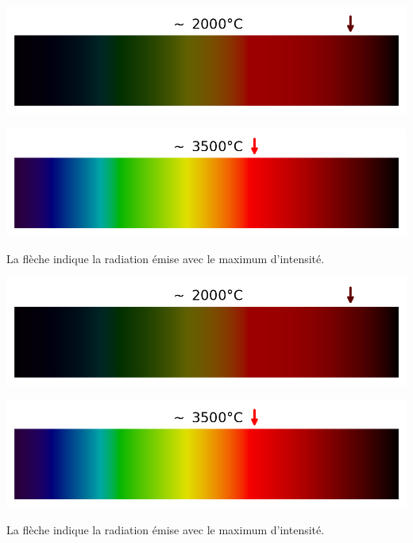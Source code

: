 \documentclass[12pt,a4paper,fleqn]{article}
\begin{document}
\begin{center}
\begin{multicols}{2}
\includegraphics[width=\linewidth]{images/spectrum_black_body_temp2500K.png}

\includegraphics[width=\linewidth]{images/spectrum_black_body_temp4000K.png}
\end{multicols}
La flèche indique la radiation émise avec le maximum d'intensité.
\end{center}

\begin{center}
\begin{multicols}{2}
\includegraphics[width=\linewidth]{images/spectrum_black_body_temp2500K.png}

\includegraphics[width=\linewidth]{images/spectrum_black_body_temp4000K.png}
\end{multicols}
La flèche indique la radiation émise avec le maximum d'intensité.
\end{center}
\end{document}
